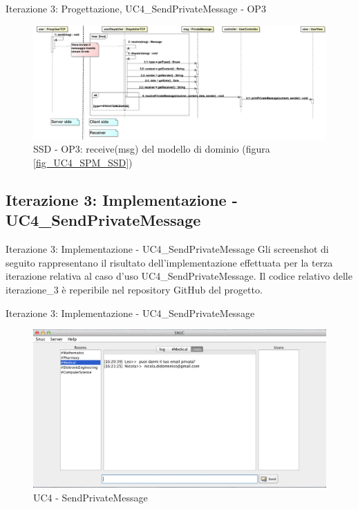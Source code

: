 \begin{frame} {Iterazione 3: Progettazione, UC4\_SendPrivateMessage - OP3}
   \begin{figure}
     \includegraphics[scale=0.14]{image_astah/Iteration_3_DesignModel/UC4_SendPrivateMessage_SSD_3_receive.png}{\centering}
     \caption{SSD - OP3: receive(msg) del modello di dominio (figura \ref{fig_UC4_SPM_SSD})}
     \label{fig_UC4_SSD_SRM_3} 
   \end{figure}
\end{frame}


\subsection {Iterazione 3: Implementazione - UC4\_SendPrivateMessage}
 \begin{frame} {Iterazione 3: Implementazione - UC4\_SendPrivateMessage }
   Gli screenshot di seguito rappresentano il risultato dell'implementazione effettuata per la terza iterazione relativa al caso d'uso UC4\_SendPrivateMessage.
   \newline
   Il codice relativo delle iterazione\_3 è reperibile nel repository GitHub del progetto.
 \end{frame}

\begin{frame} {Iterazione 3: Implementazione - UC4\_SendPrivateMessage}
    \begin{figure}
    \includegraphics[scale=0.32]{image_implementation/uc4/10.png}{\centering}
    \caption{UC4 - SendPrivateMessage }
   \end{figure}
\end{frame}

